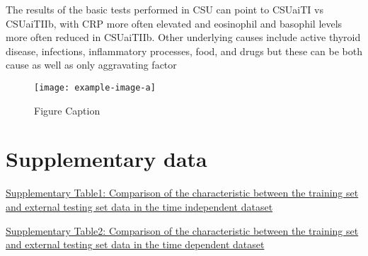 \documentclass[preprint,12pt,authoryear]{elsarticle}
\begin{document}
The results of the basic tests performed in CSU can point to CSUaiTI vs CSUaiTIIb, with CRP more often elevated and eosinophil and basophil levels more often reduced in CSUaiTIIb\citep{Xiang2023Chronic}.
Other underlying causes include active thyroid disease, infections, inflammatory processes, food, and drugs but these can be both cause as well as only aggravating factor\citep{Kolkhir2021Autoimmune}







\begin{figure}[t]%
\centering%
\texttt{[image: example-image-a]}
\caption{Figure Caption}\label{fig2}
\end{figure}


\appendix
\section{Supplementary data}\label{sec:supplementary}

\href{run:latex_data_description_table_train_test_origi.tex}{Supplementary Table1: Comparison of the characteristic between the training set and external testing set data in the time independent dataset}
\label{tab:train_test_origi}

\href{run:latex_data_description_table_train_test_time.tex}{Supplementary Table2: Comparison of the characteristic between the training set and external testing set data in the time dependent dataset}
\label{tab:train_test_time}


 


 
\end{document}

